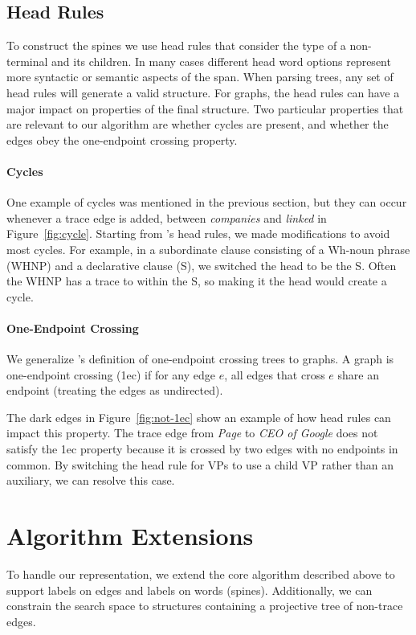 \subsection{Head Rules}

To construct the spines we use head rules that consider the type of a non-terminal and its children.
In many cases different head word options represent more syntactic or semantic aspects of the span.
When parsing trees, any set of head rules will generate a valid structure.
For graphs, the head rules can have a major impact on properties of the final structure.
Two particular properties that are relevant to our algorithm are whether cycles are present, and whether the edges obey the one-endpoint crossing property.

\paragraph{Cycles}
One example of cycles was mentioned in the previous section, but they can occur whenever a trace edge is added, \myeg between \emph{companies} and \emph{linked} in Figure~\ref{fig:cycle}.
Starting from \textcite{cck}'s head rules, we made modifications to avoid most cycles.
For example, in a subordinate clause consisting of a Wh-noun phrase (WHNP) and a declarative clause (S), we switched the head to be the S.
Often the WHNP has a trace to within the S, so making it the head would create a cycle.

\paragraph{One-Endpoint Crossing}
We generalize \textcite{ec}'s definition of one-endpoint crossing trees to graphs.
A graph is one-endpoint crossing (1ec) if for any edge $e$, all edges that cross $e$ share an endpoint (treating the edges as undirected).

The dark edges in Figure~\ref{fig:not-1ec} show an example of how head rules can impact this property.
The trace edge from \emph{Page} to \emph{CEO of Google} does not satisfy the 1ec property because it is crossed by two edges with no endpoints in common.
By switching the head rule for VPs to use a child VP rather than an auxiliary, we can resolve this case.

\section{Algorithm Extensions}
To handle our representation, we extend the core algorithm described above to support labels on edges and labels on words (spines).
Additionally, we can constrain the search space to structures containing a projective tree of non-trace edges.

